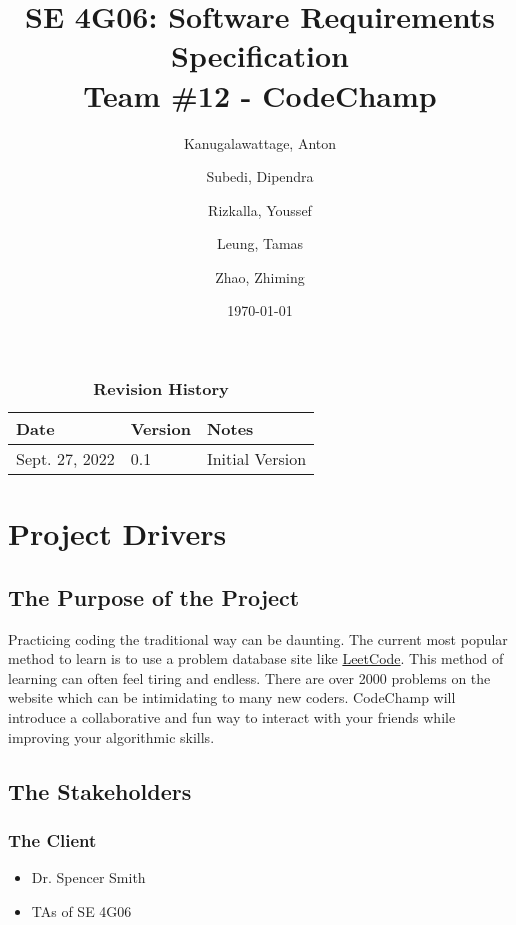 \documentclass[12pt, titlepage]{article}
\title{SE 4G06: Software Requirements Specification\\Team \#12 - CodeChamp}
\author{
  Kanugalawattage, Anton
  \and
  Subedi, Dipendra
  \and
  Rizkalla, Youssef
  \and
  Leung, Tamas
  \and
  Zhao, Zhiming
}
\date{\today}
\begin{document}
\maketitle

\tableofcontents
\listoftables
\listoffigures

\begin{table}[bp]
\caption{\bf Revision History}
\begin{tabularx}{\textwidth}{p{3cm}p{2cm}X}
\toprule {\bf Date} & {\bf Version} & {\bf Notes}\\
\midrule
Sept. 27, 2022 & 0.1 & Initial Version\\
\bottomrule
\end{tabularx}
\end{table}


\newpage





\section{Project Drivers}

\subsection{The Purpose of the Project}

Practicing coding the traditional way can be daunting. The current most popular method to learn is to use a problem database site like \href{http://www.leetcode.com}{LeetCode}. This method of learning can often feel tiring and endless. There are over 2000 problems on the website which can be intimidating to many new coders. CodeChamp will introduce a collaborative and fun way to interact with your friends while improving your algorithmic skills.

\subsection{The Stakeholders}

\subsubsection{The Client}
\begin{itemize}
    \item Dr. Spencer Smith
    \item TAs of SE 4G06
\end{itemize}
\end{document}

